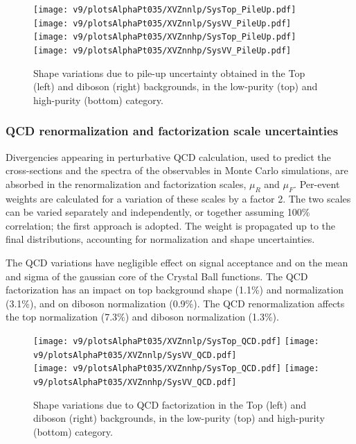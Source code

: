  \begin{figure}[!htb]
   \begin{center}
     \texttt{[image: v9/plotsAlphaPt035/XVZnnlp/SysTop\_PileUp.pdf]}
     \texttt{[image: v9/plotsAlphaPt035/XVZnnlp/SysVV\_PileUp.pdf]}
     \\
     \texttt{[image: v9/plotsAlphaPt035/XVZnnhp/SysTop\_PileUp.pdf]}
     \texttt{[image: v9/plotsAlphaPt035/XVZnnhp/SysVV\_PileUp.pdf]}

   \end{center}
   \caption{Shape variations due to pile-up uncertainty obtained in the Top (left) and diboson (right) backgrounds, in the low-purity (top) and high-purity (bottom) category.}
   \label{fig:syspileup}
 \end{figure}


\subsubsection{QCD renormalization and factorization scale uncertainties}

Divergencies appearing in perturbative QCD calculation, used to predict the cross-sections and the spectra of the observables in Monte Carlo simulations, are absorbed in the renormalization and factorization scales, $\mu_R$ and $\mu_F$. Per-event weights are calculated for a variation of these scales by a factor 2. The two scales can be varied separately and independently, or together assuming 100\% correlation; the first approach is adopted. The weight is propagated up to the final distributions, accounting for normalization and shape uncertainties.

\noindent The QCD variations have negligible effect on signal acceptance and on the mean and sigma of the gaussian core of the Crystal Ball functions. The QCD factorization has an impact on top background shape (1.1\%) and normalization (3.1\%), and on diboson normalization (0.9\%). The QCD renormalization affects the top normalization (7.3\%) and diboson normalization (1.3\%).

 \begin{figure}[!htb]
   \begin{center}
     \texttt{[image: v9/plotsAlphaPt035/XVZnnlp/SysTop\_QCD.pdf]}
     \texttt{[image: v9/plotsAlphaPt035/XVZnnlp/SysVV\_QCD.pdf]}
     \\
     \texttt{[image: v9/plotsAlphaPt035/XVZnnhp/SysTop\_QCD.pdf]}
     \texttt{[image: v9/plotsAlphaPt035/XVZnnhp/SysVV\_QCD.pdf]}

   \end{center}
   \caption{Shape variations due to QCD factorization in the Top (left) and diboson (right) backgrounds, in the low-purity (top) and high-purity (bottom) category.}
   \label{fig:sysScale}
 \end{figure}


